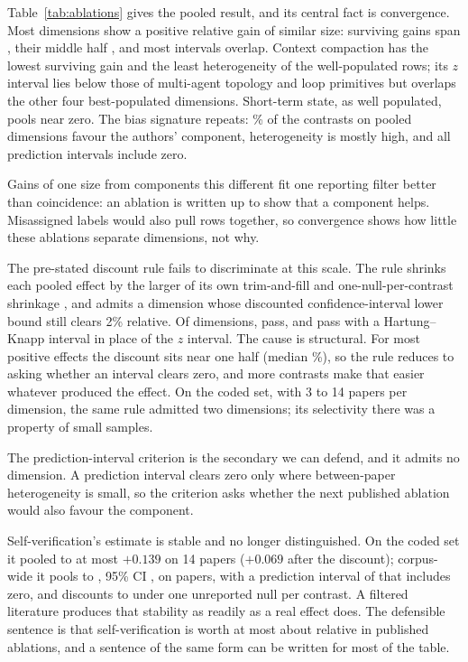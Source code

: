 

Table~\ref{tab:ablations} gives the pooled result, and its central fact is convergence. Most
dimensions show a positive relative gain of similar size: surviving gains span
\rqEffectRangeSurviving{}, their middle half \rqEffectIQRSurviving, and most intervals overlap.
Context compaction has the lowest surviving gain and the least heterogeneity of the well-populated
rows; its $z$ interval lies below those of multi-agent topology and loop primitives but overlaps the
other four best-populated dimensions. Short-term state, as well populated, pools near zero. The bias
signature repeats: \rqSignSharePct\% of the \rqSignDenom{} contrasts on pooled dimensions favour the
authors' component, heterogeneity is mostly high, and all \rqPIIncludesZeroCount{} prediction
intervals include zero.

Gains of one size from components this different fit one reporting filter better than coincidence:
an ablation is written up to show that a component helps. Misassigned labels would also pull rows
together, so convergence shows how little these ablations separate dimensions, not why.

The pre-stated discount rule fails to discriminate at this scale. The rule
shrinks each pooled effect by the larger of its own trim-and-fill and one-null-per-contrast shrinkage
\citep{duval2000trimfill,copas2000funnel}, and admits a dimension whose discounted confidence-interval
lower bound still clears 2\% relative. Of \rqPoolableDims{} dimensions, \rqDiscountSurviveZ{} pass, and
\rqDiscountSurviveHK{} pass with a Hartung--Knapp interval in place of the $z$ interval. The cause is
structural. For most positive effects the discount sits near one half (median \rqMedianDiscountPct\%), so
the rule reduces to asking whether an interval clears zero, and more contrasts make that easier
whatever produced the effect. On the coded set, with 3 to 14 papers per dimension, the same rule
admitted two dimensions; its selectivity there was a property of small samples.

The prediction-interval criterion \citep{higgins2009predictioninterval} is the secondary we can defend,
and it admits no dimension. A prediction interval clears zero only where between-paper heterogeneity is small, so the criterion asks
whether the next published ablation would also favour the component.

Self-verification's estimate is stable and no longer distinguished. On the coded set it pooled to at
most $+0.139$ on 14 papers ($+0.069$ after the discount); corpus-wide it pools to \rqSVPooled, 95\% CI
\rqSVCIz, on \rqSVPapers{} papers, with a prediction interval of \rqSVPI{} that includes zero, and
discounts to \rqSVDiscounted{} under one unreported null per contrast. A filtered literature produces
that stability as readily as a real effect does. The defensible sentence is that self-verification is worth at most about
\rqSVDiscounted{} relative in published ablations, and a sentence of the same form can be written for
most of the table.


